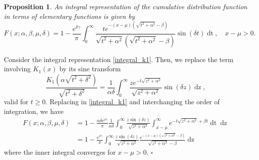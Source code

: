 \documentclass[10pt,a4paper,oneside]{article}
\newtheorem{proposition}[theorem]{Proposition}
\newenvironment{proof}{\noindent{\bf Proof:}}{\hfill$\square$}
\numberwithin{equation}{section}
\begin{document}
\begin{proposition}
An integral representation of the cumulative distribution function in terms of elementary functions is given by
\begin{equation}\label{integral_sine_transform}
F(x; \alpha, \beta, \mu, \delta) = 1 - \frac{e^{\delta \gamma}}{\pi}\int_0^{\infty} \frac{t e^{-(x-\mu)\left(\sqrt{t^2 + \alpha^2} - \beta\right)}}{\sqrt{t^2 + \alpha^2}\left(\sqrt{t^2 + \alpha^2} - \beta\right)}\sin(\delta t)\mathop{dt}, \quad x-\mu > 0.
\end{equation}
\end{proposition}
\begin{proof}
Consider the integral representation \eqref{integral_k1}. Then, we replace the term involving $K_1(x)$ by its sine transform \cite[\S 2.4]{Bateman1954}
\begin{equation*}
\frac{K_1(\alpha \sqrt{t^2 + \delta^2})}{\sqrt{t^2 + \delta^2}} = \frac{1}{\alpha\delta}\int_0^{\infty} \frac{z e^{-t\sqrt{z^2 + \alpha^2}}}{\sqrt{z^2 + \alpha^2}} \sin(\delta z) \mathop{dz},
\end{equation*}
valid for $t \ge 0$. Replacing in \eqref{integral_k1} and interchanging the order of integration, we have
\begin{align*}
F(x; \alpha, \beta, \mu, \delta) &= 1 - \frac{\alpha \delta e^{\delta \gamma}}{\pi}\frac{1}{\alpha\delta}\int_0^{\infty} \frac{z \sin(\delta z)}{\sqrt{z^2 + \alpha^2}}  \int_{x-\mu}^{\infty} e^{-t\sqrt{z^2 + \alpha^2} + \beta t} \mathop{dt} \mathop{dz}\\
&= 1 - \frac{e^{\delta \gamma}}{\pi}\int_0^{\infty} \frac{z \sin(\delta z)}{\sqrt{z^2 + \alpha^2}}  \frac{e^{-(x-\mu)\left(\sqrt{z^2 + \alpha^2} - \beta\right)}}{\sqrt{z^2 + \alpha^2} - \beta} \mathop{dz}
\end{align*}
where the inner integral converges for $x-\mu > 0$.
\end{proof}
\end{document}
